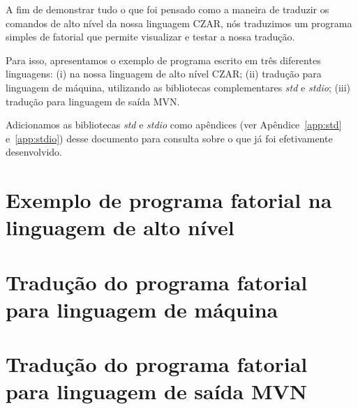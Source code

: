 
A fim de demonstrar tudo o que foi pensado como a maneira de traduzir os comandos de alto nível da nossa linguagem CZAR, nós traduzimos um programa simples de fatorial que permite visualizar e testar a nossa tradução.

Para isso, apresentamos o exemplo de programa escrito em três diferentes linguagens: (i) na nossa linguagem de alto nível CZAR; (ii) tradução para linguagem de máquina, utilizando as bibliotecas complementares \emph{std} e \emph{stdio}; (iii) tradução para linguagem de saída MVN.

Adicionamos as bibliotecas \emph{std} e \emph{stdio} como apêndices (ver Apêndice~\ref{app:std} e~\ref{app:stdio}) desse documento para consulta sobre o que já foi efetivamente desenvolvido.

\section{Exemplo de programa fatorial na linguagem de alto nível}
\label{sec:alto-nivel}



\section{Tradução do programa fatorial para linguagem de máquina}
\label{sec:traducao-asm}



\section{Tradução do programa fatorial para linguagem de saída MVN}
\label{sec:traducao-mvn}


